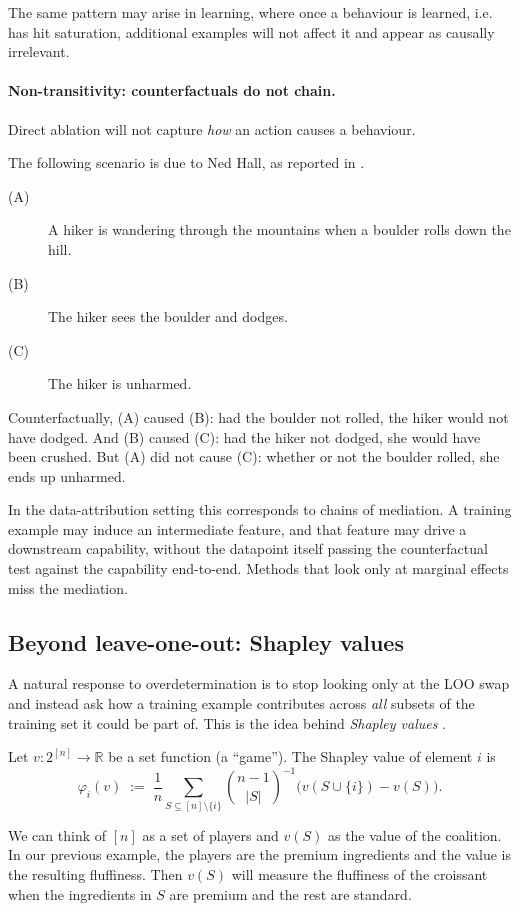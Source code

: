 The same pattern may arise in learning, where once a behaviour is learned, i.e. has hit saturation, additional examples will not affect it and appear as causally irrelevant.


\paragraph{Non-transitivity: counterfactuals do not chain.} Direct ablation will not capture \emph{how} an action causes a behaviour.

\begin{example}\label{ex:nontransitive}
  The following scenario is due to Ned Hall, as reported in \citet{hitchcock2001intransitivity}.
  \begin{description}
    \item[(A)] A hiker is wandering through the mountains when a boulder rolls down the hill.
    \item[(B)] The hiker sees the boulder and dodges.
    \item[(C)] The hiker is unharmed.
  \end{description}
  Counterfactually, (A) caused (B): had the boulder not rolled, the hiker would not have dodged. And (B) caused (C): had the hiker not dodged, she would have been crushed. But (A) did not cause (C): whether or not the boulder rolled, she ends up unharmed.
\end{example}

In the data-attribution setting this corresponds to chains of mediation. A training example may induce an intermediate feature, and that feature may drive a downstream capability, without the datapoint itself passing the counterfactual test against the capability end-to-end. Methods that look only at marginal effects miss the mediation.

\subsection{Beyond leave-one-out: Shapley values}\label{subsec:shapley}

A natural response to overdetermination is to stop looking only at the LOO swap and instead ask how a training example contributes across \emph{all} subsets of the training set it could be part of. This is the idea behind \emph{Shapley values} \citep{shapley1953value}.

\begin{definition}\label{def:shapley}
  Let $v: 2^{[n]} \to \mathbb{R}$ be a set function (a ``game''). The Shapley value of element $i$ is
  \[
    \varphi_i(v) \;:=\; \frac{1}{n}\sum_{S \subseteq [n] \setminus \{i\}} \binom{n-1}{|S|}^{-1} \bigl(v(S \cup \{i\}) - v(S)\bigr).
  \]
\end{definition}
We can think of $[n]$ as a set of players and $v(S)$ as the value of the coalition. In our previous example, the players are the premium ingredients and the value is the resulting fluffiness. Then $v(S)$ will measure the fluffiness of the croissant when the ingredients in $S$ are premium and the rest are standard.

